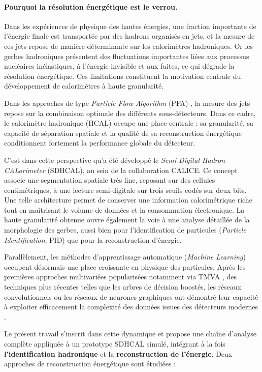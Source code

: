 \paragraph{Pourquoi la résolution énergétique est le verrou.}

Dans les expériences de physique des hautes énergies, une fraction importante de l’énergie finale est transportée par des hadrons organisés en jets, et la mesure de ces jets repose de manière déterminante sur les calorimètres hadroniques. Or les gerbes hadroniques présentent des fluctuations importantes liées aux processus nucléaires inélastiques, à l’énergie invisible et aux fuites, ce qui dégrade la résolution énergétique. Ces limitations constituent la motivation centrale du développement de calorimètres à haute granularité.

Dans les approches de type \emph{Particle Flow Algorithm} (PFA) \cite{thomson2009pandora}, la mesure des jets repose sur la combinaison optimale des différents sous-détecteurs. Dans ce cadre, le calorimètre hadronique (HCAL) occupe une place centrale : sa granularité, sa capacité de séparation spatiale et la qualité de sa reconstruction énergétique conditionnent fortement la performance globale du détecteur.

C’est dans cette perspective qu’a été développé le \emph{Semi-Digital Hadron CALorimeter} (SDHCAL), au sein de la collaboration CALICE. Ce concept associe une segmentation spatiale très fine, reposant sur des cellules centimétriques, à une lecture semi-digitale sur trois seuils codés sur deux bits. Une telle architecture permet de conserver une information calorimétrique riche tout en maîtrisant le volume de données et la consommation électronique. La haute granularité obtenue ouvre également la voie à une analyse détaillée de la morphologie des gerbes, aussi bien pour l’identification de particules (\emph{Particle Identification}, PID) que pour la reconstruction d’énergie.

Parallèlement, les méthodes d’apprentissage automatique (\emph{Machine Learning}) occupent désormais une place croissante en physique des particules. Après les premières approches multivariées popularisées notamment via TMVA \cite{tmva2007}, des techniques plus récentes telles que les arbres de décision boostés, les réseaux convolutionnels ou les réseaux de neurones graphiques ont démontré leur capacité à exploiter efficacement la complexité des données issues des détecteurs modernes \cite{qu2020,abdughani2019gnn}.

Le présent travail s’inscrit dans cette dynamique et propose une chaîne d’analyse complète appliquée à un prototype SDHCAL simulé, intégrant à la fois \textbf{l’identification hadronique} et la \textbf{reconstruction de l’énergie}. Deux approches de reconstruction énergétique sont étudiées :


